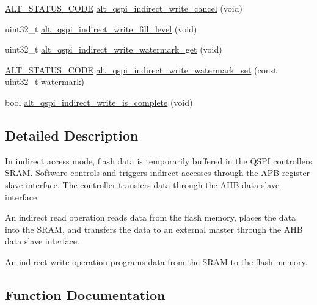 \begin{DoxyCompactItemize}
\item 
\mbox{\hyperlink{hwlib_8h_abdb0d369f069723ca55d6c94bcaaaa12}{A\+L\+T\+\_\+\+S\+T\+A\+T\+U\+S\+\_\+\+C\+O\+DE}} \mbox{\hyperlink{group__ALT__QSPI__INDAC_gab230e625145fcc1cab7ac7f1255a15ce}{alt\+\_\+qspi\+\_\+indirect\+\_\+write\+\_\+cancel}} (void)
\item 
uint32\+\_\+t \mbox{\hyperlink{group__ALT__QSPI__INDAC_gac43e6a8266b083b11f61f4443c391d11}{alt\+\_\+qspi\+\_\+indirect\+\_\+write\+\_\+fill\+\_\+level}} (void)
\item 
uint32\+\_\+t \mbox{\hyperlink{group__ALT__QSPI__INDAC_gaa3558aff9a1c3995ad175b16cb4635ad}{alt\+\_\+qspi\+\_\+indirect\+\_\+write\+\_\+watermark\+\_\+get}} (void)
\item 
\mbox{\hyperlink{hwlib_8h_abdb0d369f069723ca55d6c94bcaaaa12}{A\+L\+T\+\_\+\+S\+T\+A\+T\+U\+S\+\_\+\+C\+O\+DE}} \mbox{\hyperlink{group__ALT__QSPI__INDAC_ga073b6e8986e869fbde56e74e699feed1}{alt\+\_\+qspi\+\_\+indirect\+\_\+write\+\_\+watermark\+\_\+set}} (const uint32\+\_\+t watermark)
\item 
bool \mbox{\hyperlink{group__ALT__QSPI__INDAC_gacc44a84a99a06afa241272a686f3bb33}{alt\+\_\+qspi\+\_\+indirect\+\_\+write\+\_\+is\+\_\+complete}} (void)
\end{DoxyCompactItemize}


\subsection{Detailed Description}
In indirect access mode, flash data is temporarily buffered in the Q\+S\+PI controller\textquotesingle{}s S\+R\+AM. Software controls and triggers indirect accesses through the A\+PB register slave interface. The controller transfers data through the A\+HB data slave interface.

An indirect read operation reads data from the flash memory, places the data into the S\+R\+AM, and transfers the data to an external master through the A\+HB data slave interface.

An indirect write operation programs data from the S\+R\+AM to the flash memory. 

\subsection{Function Documentation}
\mbox{\label{group__ALT__QSPI__INDAC_ga44da2573bde828e7d5f1675419df63e7}} 
